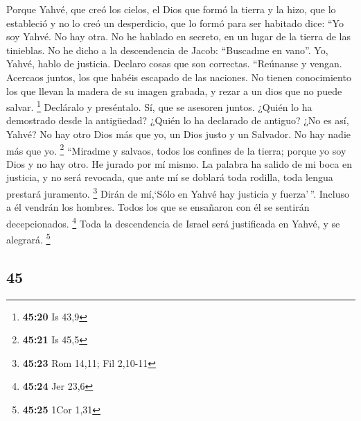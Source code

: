 \begin{paracol}{2}
 Porque Yahvé, que creó los cielos, el Dios que formó la
tierra y la hizo, que lo estableció y no lo creó un desperdicio, que lo
formó para ser habitado dice: ``Yo soy Yahvé. No hay otra.
 No he hablado en secreto, en un lugar de la tierra de
las tinieblas. No he dicho a la descendencia de Jacob: ``Buscadme en
vano''. Yo, Yahvé, hablo de justicia. Declaro cosas que son correctas.
 ``Reúnanse y vengan. Acercaos juntos, los que habéis
escapado de las naciones. No tienen conocimiento los que llevan la
madera de su imagen grabada, y rezar a un dios que no puede salvar.
\footnote{\textbf{45:20} Is 43,9}  Decláralo y
preséntalo. Sí, que se asesoren juntos. ¿Quién lo ha demostrado desde la
antigüedad? ¿Quién lo ha declarado de antiguo? ¿No es así, Yahvé? No hay
otro Dios más que yo, un Dios justo y un Salvador. No hay nadie más que
yo. \footnote{\textbf{45:21} Is 45,5}  ``Miradme y
salvaos, todos los confines de la tierra; porque yo soy Dios y no hay
otro.  He jurado por mí mismo. La palabra ha salido de mi
boca en justicia, y no será revocada, que ante mí se doblará toda
rodilla, toda lengua prestará juramento. \footnote{\textbf{45:23} Rom
  14,11; Fil 2,10-11}  Dirán de mí,`Sólo en Yahvé hay
justicia y fuerza'\,''. Incluso a él vendrán los hombres. Todos los que
se ensañaron con él se sentirán decepcionados. \footnote{\textbf{45:24}
  Jer 23,6}  Toda la descendencia de Israel será
justificada en Yahvé, y se alegrará. \footnote{\textbf{45:25} 1Cor 1,31}

\switchcolumn
\begin{otherlanguage}{english}

\hypertarget{section-89}{%
\section{45}\label{section-89}}


\end{otherlanguage}
\end{paracol}
